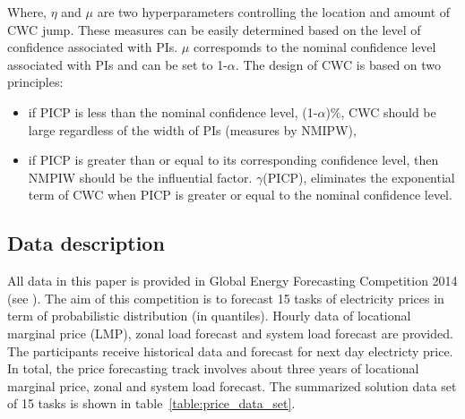 \documentclass[review]{elsarticle}
\begin{document}
    Where, $\eta$ and $\mu$ are two hyperparameters controlling the location and amount of CWC jump. These measures can be easily determined based on the level of confidence associated with PIs. $\mu$ correspomds to the nominal confidence level associated with PIs and can be set to 1-$\alpha$. The design of CWC is based on two principles:

    \begin{itemize}
      \item if PICP is less than the nominal confidence level, (1-$\alpha$)$\%$, CWC should be large regardless of the width of PIs (measures by NMIPW),
      \item if PICP is greater than or equal to its corresponding confidence level, then NMPIW should be the influential factor. $\gamma$(PICP), eliminates the exponential term of CWC when PICP is greater or equal to the nominal confidence level.
    \end{itemize}

  \subsection{Data description}
    All data in this paper is provided in Global Energy Forecasting Competition 2014 (see \cite{Hong2016}). The aim of this competition is to forecast 15 tasks of electricity prices in term of probabilistic distribution (in quantiles). Hourly data of locational marginal price (LMP), zonal load forecast and system load forecast are provided. The participants receive historical data and forecast for next day electricty price. In total, the price forecasting track involves about three years of locational marginal price, zonal and system load forecast. The summarized solution data set of 15 tasks is shown in table~\ref{table:price_data_set}.
\end{document}

